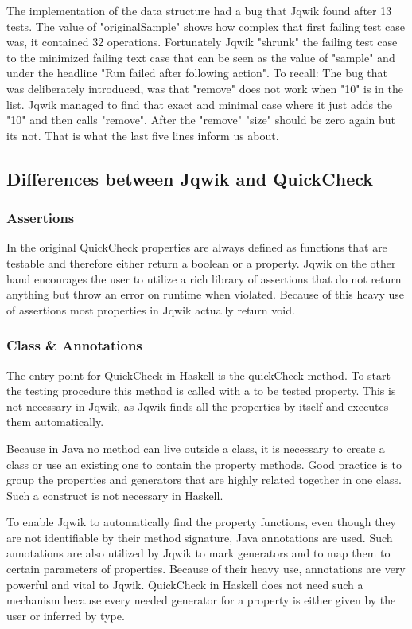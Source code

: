 \documentclass[a4paper, 12pt]{article} %
\begin{document}
The implementation of the data structure had a bug that Jqwik found after 13 tests. The value of "originalSample" shows how complex that first failing test case was, it contained 32 operations. Fortunately Jqwik "shrunk" the failing test case to the minimized failing text case that can be seen as the value of "sample" and under the headline "Run failed after following action". To recall: The bug that was deliberately introduced, was that "remove" does not work when "10" is in the list. Jqwik managed to find that exact and minimal case where it just adds the "10" and then calls "remove". After the "remove" "size" should be zero again but its not. That is what the last five lines inform us about.

\subsection{Differences between Jqwik and QuickCheck}

\subsubsection{Assertions}

In the original QuickCheck properties are always defined as functions that are testable and therefore either return a boolean or a property. Jqwik on the other hand encourages the user to utilize a rich library of assertions that do not return anything but throw an error on runtime when violated. Because of this heavy use of assertions most properties in Jqwik actually return void.

\subsubsection{Class \& Annotations}

The entry point for QuickCheck in Haskell is the quickCheck method. To start the testing procedure this method is called with a to be tested property. This is not necessary in Jqwik, as Jqwik finds all the properties by itself and executes them automatically. 

Because in Java no method can live outside a class, it is necessary to create a class or use an existing one to contain the property methods. Good practice is to group the properties and generators that are highly related together in one class. Such a construct is not necessary in Haskell.

To enable Jqwik to automatically find the property functions, even though they are not identifiable by their method signature, Java annotations are used. Such annotations are also utilized by Jqwik to mark generators and to map them to certain parameters of properties. Because of their heavy use, annotations are very powerful and vital to Jqwik. QuickCheck in Haskell does not need such a mechanism because every needed generator for a property is either given by the user or inferred by type.
\end{document}
